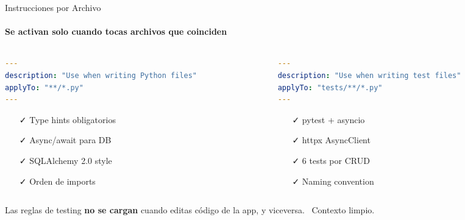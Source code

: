\documentclass[aspectratio=169,11pt]{beamer}
\begin{document}
\begin{frame}[fragile]{Instrucciones por Archivo}
  \framesubtitle{Se activan solo cuando tocas archivos que coinciden}

  \begin{columns}[T]
    \begin{column}{0.47\textwidth}
      \begin{tcolorbox}[colback=ixtiDark!3, colframe=ixtiTeal, title={\textcolor{white}{\faPython\ python-api}}, fonttitle=\tiny\bfseries\ttfamily]
        \begin{lstlisting}[language=yaml, basicstyle=\ttfamily\fontsize{5}{6}\selectfont]
---
description: "Use when writing Python files"
applyTo: "**/*.py"
---
        \end{lstlisting}
        \vspace{-0.5em}
        \scriptsize
        \begin{itemize}
          \item[\textcolor{ixtiGreen}{\faCheck}] Type hints obligatorios
          \item[\textcolor{ixtiGreen}{\faCheck}] Async/await para DB
          \item[\textcolor{ixtiGreen}{\faCheck}] SQLAlchemy 2.0 style
          \item[\textcolor{ixtiGreen}{\faCheck}] Orden de imports
        \end{itemize}
      \end{tcolorbox}
    \end{column}
    \begin{column}{0.47\textwidth}
      \begin{tcolorbox}[colback=ixtiDark!3, colframe=ixtiTeal, title={\textcolor{white}{\faVial\ testing}}, fonttitle=\tiny\bfseries\ttfamily]
        \begin{lstlisting}[language=yaml, basicstyle=\ttfamily\fontsize{5}{6}\selectfont]
---
description: "Use when writing test files"
applyTo: "tests/**/*.py"
---
        \end{lstlisting}
        \vspace{-0.5em}
        \scriptsize
        \begin{itemize}
          \item[\textcolor{ixtiGreen}{\faCheck}] pytest + asyncio
          \item[\textcolor{ixtiGreen}{\faCheck}] httpx AsyncClient
          \item[\textcolor{ixtiGreen}{\faCheck}] 6 tests por CRUD
          \item[\textcolor{ixtiGreen}{\faCheck}] Naming convention
        \end{itemize}
      \end{tcolorbox}
    \end{column}
  \end{columns}

  \vspace{0.5em}
  \centering\small\textcolor{ixtiDark}{Las reglas de testing \textbf{no se cargan} cuando editas c\'odigo de la app, y viceversa. \textcolor{ixtiGreen}{\faLeaf\ Contexto limpio.}}
\end{frame}
\end{document}
